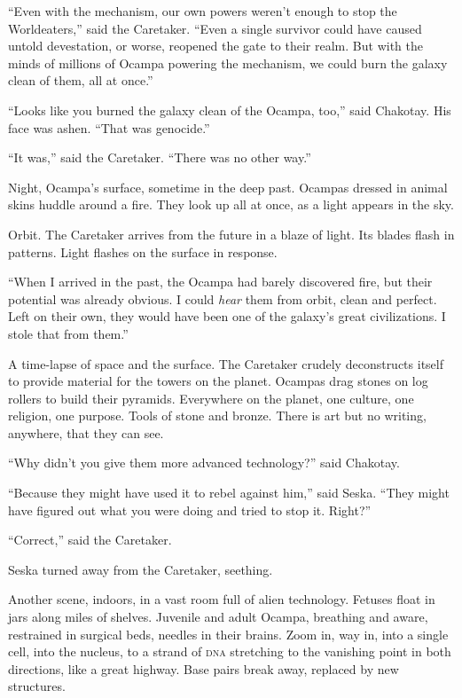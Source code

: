 \documentclass[twoside,letterpaper,12pt]{memoir}
\begin{document}
``Even with the mechanism, our own powers weren’t enough to stop the Worldeaters,” said the Caretaker. ``Even a single survivor could have caused untold devestation, or worse, reopened the gate to their realm. But with the minds of millions of Ocampa powering the mechanism, we could burn the galaxy clean of them, all at once.” 

``Looks like you burned the galaxy clean of the Ocampa, too,” said Chakotay. His face was ashen. ``That was genocide.” 

``It was,” said the Caretaker. ``There was no other way.” 

Night, Ocampa’s surface, sometime in the deep past. Ocampas dressed in animal skins huddle around a fire. They look up all at once, as a light appears in the sky. 

Orbit. The Caretaker arrives from the future in a blaze of light. Its blades flash in patterns. Light flashes on the surface in response. 

``When I arrived in the past, the Ocampa had barely discovered fire, but their potential was already obvious. I could \textit{hear} them from orbit, clean and perfect. Left on their own, they would have been one of the galaxy’s great civilizations. I stole that from them.” 

A time-lapse of space and the surface. The Caretaker crudely deconstructs itself to provide material for the towers on the planet. Ocampas drag stones on log rollers to build their pyramids. Everywhere on the planet, one culture, one religion, one purpose. Tools of stone and bronze. There is art but no writing, anywhere, that they can see. 

``Why didn’t you give them more advanced technology?” said Chakotay. 

``Because they might have used it to rebel against him,” said Seska. ``They might have figured out what you were doing and tried to stop it. Right?” 

``Correct,” said the Caretaker. 

Seska turned away from the Caretaker, seething. 

Another scene, indoors, in a vast room full of alien technology. Fetuses float in jars along miles of shelves. Juvenile and adult Ocampa, breathing and aware, restrained in surgical beds, needles in their brains. Zoom in, way in, into a single cell, into the nucleus, to a strand of \textsc{dna} stretching to the vanishing point in both directions, like a great highway. Base pairs break away, replaced by new structures. 
\end{document}
